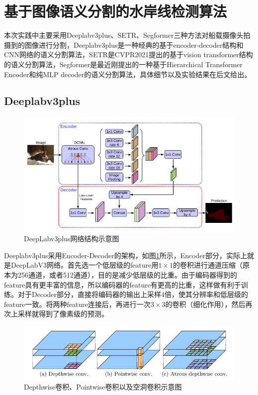 \documentclass[cn,12pt,color=mine,scheme=chinese,bibstyle=gb7714-2015]{elegantbook}
\begin{document}
\section{基于图像语义分割的水岸线检测算法}
本次实践中主要采用Deeplabv3plus、SETR、Segformer三种方法对船载摄像头拍摄到的图像进行分割，Deeplabv3plus是一种经典的基于encoder-decoder结构和CNN网络的语义分割算法，SETR是CVPR2021提出的基于vision transformer\cite{dosovitskiy2021image}结构的语义分割算法，Segformer是最近刚提出的一种基于Hierarchical Transformer Encoder和纯MLP decoder的语义分割算法，具体细节以及实验结果在后文给出。

\subsection{Deeplabv3plus}

\begin{figure}[h]
	\centering
	\includegraphics[width=.9\linewidth]{images/deeplabv3plus}
	\caption{\label{deeplabv3plus}DeepLabv3plus网络结构示意图}
\end{figure}

Deeplabv3plus\cite{chen2018encoderdecoder}采用Encoder-Decoder的架构，如图\ref{deeplabv3plus}所示，Encoder部分，实际上就是DeepLabV3\cite{chen2017rethinking}网络。首先选一个低层级的feature用$1\times 1$的卷积进行通道压缩（原本为256通道，或者512通道），目的是减少低层级的比重。由于编码器得到的feature具有更丰富的信息，所以编码器的feature有更高的比重，这样做有利于训练。对于Decoder部分，直接将编码器的输出上采样4倍，使其分辨率和低层级的feature一致。将两种feature连接后，再进行一次$3\times 3$的卷积（细化作用），然后再次上采样就得到了像素级的预测。

\begin{figure}[h]
	\centering
	\includegraphics[width=.9\linewidth]{images/deeplabv3plus-2}
	\caption{\label{deeplabv3plus2}Depthwise卷积、Pointwise卷积以及空洞卷积示意图}
\end{figure}
\end{document}
